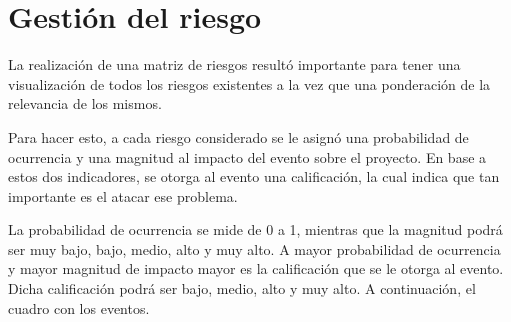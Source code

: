 \section{Gestión del riesgo}
La realización de una matriz de riesgos resultó importante para tener una visualización de todos los riesgos existentes a la vez que una ponderación de la relevancia de los mismos. 

Para hacer esto, a cada riesgo considerado se le asignó una probabilidad de ocurrencia y una magnitud al impacto del evento sobre el proyecto. En base a estos dos indicadores, se otorga al evento una calificación, la cual indica que tan importante es el atacar ese problema.

La probabilidad de ocurrencia se mide de 0 a 1, mientras que la magnitud podrá ser muy bajo, bajo, medio, alto y muy alto. A mayor probabilidad de ocurrencia y mayor magnitud de impacto mayor es la calificación que se le otorga al evento. Dicha calificación podrá ser bajo, medio, alto y muy alto. A continuación, el cuadro con los eventos.

\small
\renewcommand{\arraystretch}{1.15}

\newcommand{\bajo}{\cellcolor{yellow!20}BAJO}
\newcommand{\medio}{\cellcolor{orange!25}MEDIO}
\newcommand{\alto}{\cellcolor{red!20}ALTO}
\newcommand{\muyalto}{\cellcolor{red!45}\textbf{MUY ALTO}}

